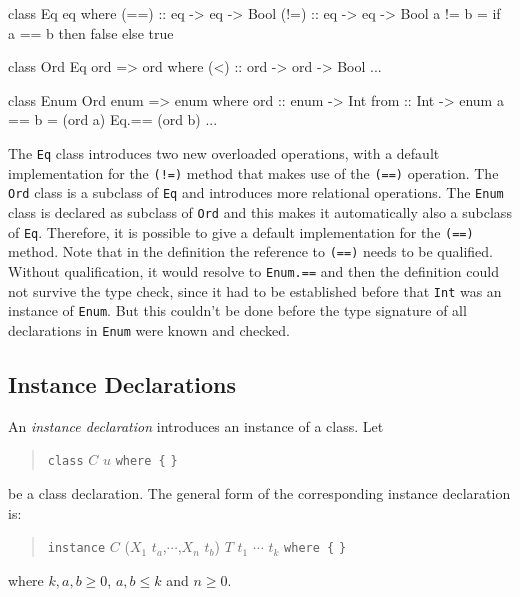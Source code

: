 \label{classexample}
\begin{code}
class Eq eq where
    (==) :: eq -> eq -> Bool
    (!=) :: eq -> eq -> Bool
    a != b  =  if a == b then false else true

class Ord Eq ord => ord where
    (<)  :: ord -> ord -> Bool
    ...

class Enum Ord enum => enum where
    ord   :: enum -> Int
    from :: Int -> enum
    a == b  =  (ord a) Eq.== (ord b)
    ...
\end{code}

The \texttt{Eq} class introduces two new overloaded operations, with a default implementation for the \texttt{(!=)} method that makes use of the \texttt{(==)} operation. The \texttt{Ord} class is a subclass of \texttt{Eq} and introduces more relational operations. The \texttt{Enum} class is declared as subclass of \texttt{Ord} and this makes it automatically also a subclass of \texttt{Eq}. Therefore, it is possible to give a default implementation for the \texttt{(==)} method. Note that in the definition the reference to \texttt{(==)} needs to be qualified. Without qualification, it would resolve to \texttt{Enum.==} and then the definition could not survive the type check, since it had to be established before that \texttt{Int} was an instance of \texttt{Enum}. But this couldn't be done before the type signature of all declarations in \texttt{Enum} were known and checked.

\subsection{Instance Declarations} \label{instdcl}  

\begin{flushleft}
      
\end{flushleft}

An \emph{instance declaration} introduces an instance of a class. Let
\begin{quote}
\texttt{class} $C$ $u$ \texttt{where \{}  \texttt{\}}
\end{quote}
be a class declaration.
The general form of the corresponding instance declaration is:
\begin{quote}
\texttt{instance} $C$ ($X_1$ $t_a$,$\cdots$,$X_n$ $t_b$) \sym{=>} $T$ $t_1$ $\cdots$ $t_k$ \texttt{where \{}  \texttt{\}}
\end{quote}
where $k,a,b \ge 0$, $a,b \le k$ and $n \ge 0$. 

